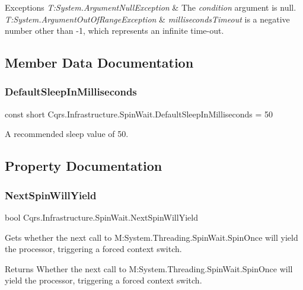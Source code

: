 \begin{DoxyExceptions}{Exceptions}
{\em T\+:\+System.\+Argument\+Null\+Exception} & The {\itshape condition}  argument is null.\\
\hline
{\em T\+:\+System.\+Argument\+Out\+Of\+Range\+Exception} & {\itshape milliseconds\+Timeout}  is a negative number other than -\/1, which represents an infinite time-\/out.\\
\hline
\end{DoxyExceptions}


\subsection{Member Data Documentation}
\mbox{\label{structCqrs_1_1Infrastructure_1_1SpinWait_a1d7345222f47db5e45af305591b92da5}} 
\subsubsection{\texorpdfstring{Default\+Sleep\+In\+Milliseconds}{DefaultSleepInMilliseconds}}
{\footnotesize\ttfamily const short Cqrs.\+Infrastructure.\+Spin\+Wait.\+Default\+Sleep\+In\+Milliseconds = 50}



A recommended sleep value of 50. 



\subsection{Property Documentation}
\mbox{\label{structCqrs_1_1Infrastructure_1_1SpinWait_a8bf89d0140fcedc664f18b41229cda0a}} 
\subsubsection{\texorpdfstring{Next\+Spin\+Will\+Yield}{NextSpinWillYield}}
{\footnotesize\ttfamily bool Cqrs.\+Infrastructure.\+Spin\+Wait.\+Next\+Spin\+Will\+Yield\hspace{0.3cm}{\ttfamily [get]}}



Gets whether the next call to M\+:\+System.\+Threading.\+Spin\+Wait.\+Spin\+Once will yield the processor, triggering a forced context switch. 

\begin{DoxyReturn}{Returns}
Whether the next call to M\+:\+System.\+Threading.\+Spin\+Wait.\+Spin\+Once will yield the processor, triggering a forced context switch. 
\end{DoxyReturn}
